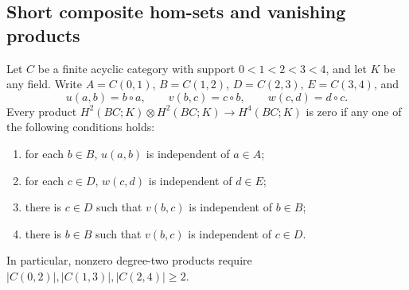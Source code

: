 \subsection{Short composite hom-sets and vanishing products}
\begin{proposition}[Proved]\label{A7:short-composite-gates}
Let $C$ be a finite acyclic category with support $0<1<2<3<4$,
and let $K$ be any field.
Write $A=C(0,1)$, $B=C(1,2)$, $D=C(2,3)$, $E=C(3,4)$, and
\[
 u(a,b)=b\circ a,\qquad v(b,c)=c\circ b,\qquad
 w(c,d)=d\circ c.
\]
Every product $H^2(BC;K)\otimes H^2(BC;K)\to H^4(BC;K)$ is zero
if any one of the following conditions holds:
\begin{enumerate}
\item for each $b\in B$, $u(a,b)$ is independent of $a\in A$;
\item for each $c\in D$, $w(c,d)$ is independent of $d\in E$;
\item there is $c\in D$ such that $v(b,c)$ is independent of $b\in B$;
\item there is $b\in B$ such that $v(b,c)$ is independent of $c\in D$.
\end{enumerate}
In particular, nonzero degree-two products require
$|C(0,2)|,|C(1,3)|,|C(2,4)|\ge2$.
\end{proposition}
